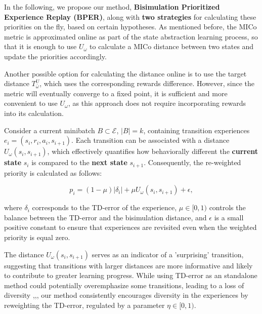 In the following, we propose our method, \textbf{Bisimulation Prioritized Experience Replay (BPER)}, along with \textbf{two strategies} for calculating these priorities on the fly, based on certain hypotheses. As mentioned before, the MICo metric is approximated online as part of the state abstraction learning process, so that it is enough to use $U_\omega$ to calculate a MICo distance between two states and update the priorities accordingly.

Another possible option for calculating the distance online is to use the target distance \(T^U_{\bar{\omega}}\), which uses the corresponding rewards difference. However, since the metric will eventually converge to a fixed point, it is sufficient and more convenient to use \(U_\omega\), as this approach does not require incorporating rewards into its calculation.


\begin{strategy}
Consider a current minibatch \(B \subset \mathcal{E}\), $|B| = k$, containing transition experiences \(e_i = (s_i, r_i, a_i, s_{i+1})\). Each transition can be associated with a distance \(U_\omega(s_i, s_{i+1})\), which effectively quantifies how behaviorally different the \textbf{current state} \(s_i\) is compared to the \textbf{next state} \(s_{i+1}\). Consequently, the re-weighted priority is calculated as follows:

\begin{equation}
    p_i = (1 - \mu) |\delta_i| + \mu U_\omega(s_i, s_{i+1}) + \epsilon,
\end{equation}

where \(\delta_i\) corresponds to the TD-error of the experience, \(\mu \in [0,1)\) controls the balance between the TD-error and the bisimulation distance, and \(\epsilon\) is a small positive constant to ensure that experiences are revisited even when the weighted priority is equal zero.
\end{strategy}

The distance \(U_\omega(s_i, s_{i+1})\) serves as an indicator of a 'surprising' transition, suggesting that transitions with larger distances are more informative and likely to contribute to greater learning progress. While using TD-error as an standalone method could potentially overemphasize some transitions, leading to a loss of diversity \cite{schaul2015prioritized},\cite{pan2022understanding},\cite{fedus2020revisiting}, our method consistently encourages diversity in the experiences by reweighting the TD-error, regulated by a parameter $\eta \in [0,1)$.

